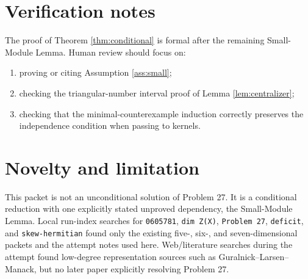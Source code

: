 \documentclass[11pt]{article}
\begin{document}
\section*{Verification notes}

The proof of Theorem \ref{thm:conditional} is formal after the remaining
Small-Module Lemma.  Human review should focus on:
\begin{enumerate}
\item proving or citing Assumption \ref{ass:small};
\item checking the triangular-number interval proof of Lemma
\ref{lem:centralizer};
\item checking that the minimal-counterexample induction correctly preserves
the independence condition when passing to kernels.
\end{enumerate}

\section*{Novelty and limitation}

This packet is not an unconditional solution of Problem 27.  It is a
conditional reduction with one explicitly stated unproved dependency, the
Small-Module Lemma.
Local run-index searches for \texttt{0605781}, \texttt{dim Z(X)},
\texttt{Problem 27}, \texttt{deficit}, and \texttt{skew-hermitian} found only
the existing five-, six-, and seven-dimensional packets and the attempt notes
used here.  Web/literature searches during the attempt found low-degree
representation sources such as Guralnick--Larsen--Manack, but no later paper
explicitly resolving Problem 27.
\end{document}
